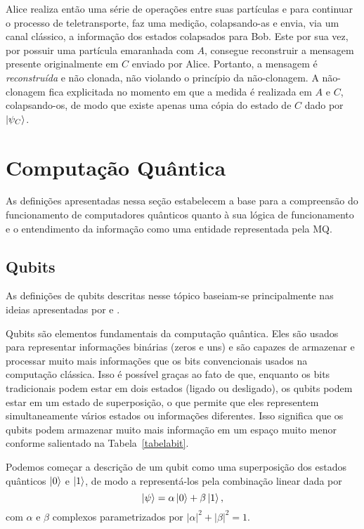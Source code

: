 Alice realiza então uma série de operações entre suas partículas e para continuar o processo de teletransporte, faz uma medição, colapsando-as e envia, via um canal clássico, a informação dos estados colapsados para Bob. Este por sua vez, por possuir uma partícula emaranhada com $A$, consegue reconstruir a mensagem presente originalmente em $C$ enviado por Alice. Portanto, a mensagem é \textit{reconstruída} e não clonada, não violando o princípio da não-clonagem. A não-clonagem fica explicitada no momento em que a medida é realizada em $A$ e $C$, colapsando-os, de modo que existe apenas uma cópia do estado de $C$ dado por $\ket{\psi_{C}}$.


\section{Computação Quântica}\label{sec:compquant}

As definições apresentadas nessa seção estabelecem a base para a compreensão do funcionamento de computadores quânticos quanto à sua lógica de funcionamento e o entendimento da informação como uma entidade representada pela MQ.

\subsection{Qubits}\label{sec:qubits}

As definições de qubits descritas nesse tópico baseiam-se principalmente nas ideias apresentadas por \textcite{chuang} e \textcite{CompInfoQuantica}.

Qubits são elementos fundamentais da computação quântica. Eles são usados para representar informações binárias (zeros e uns) e são capazes de armazenar e processar muito mais informações que os bits convencionais usados na computação clássica. Isso é possível graças ao fato de que, enquanto os bits tradicionais podem estar em dois estados (ligado ou desligado), os qubits podem estar em um estado de superposição, o que permite que eles representem simultaneamente vários estados ou informações diferentes. Isso significa que os qubits podem armazenar muito mais informação em um espaço muito menor conforme salientado na Tabela~\ref{tabelabit}.


Podemos começar a descrição de um qubit como uma superposição dos estados quânticos $\ket{0}$ e $\ket{1}$, de modo a representá-los pela combinação linear dada por
\begin{equation}\label{eq:psi}
\ket{\psi} = \alpha \ket{0} + \beta \ket{1},
\end{equation}
com $\alpha$ e $\beta$ complexos parametrizados por \(|\alpha|^{2} + |\beta|^{2} = 1\).


